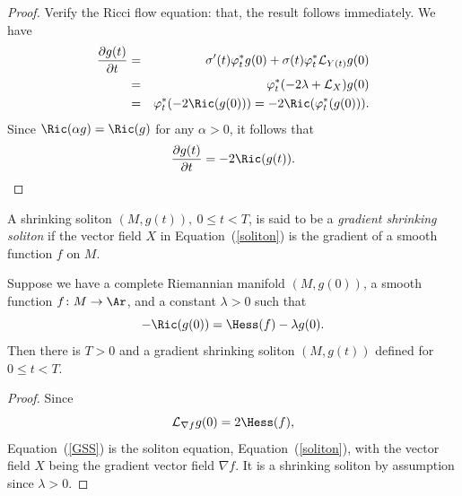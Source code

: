 \begin{proof}
\sketch Verify the Ricci flow equation:
that, the result follows immediately. We have
\begin{eqnarray*} \frac{\partial g(t)}{\partial t} & = &
\sigma'(t)\varphi_t^*g(0)+\sigma(t)\varphi_t^*{\mathcal L}_{Y(t)}g(0)\\
& = & \varphi_t^*(-2\lambda+{\mathcal L}_X)g(0)\\
& = & \varphi_t^*(-2\Ric(g(0))) =-2\Ric(\varphi_t^*(g(0))).
\end{eqnarray*}
Since $\Ric(\alpha g)=\Ric(g)$ for any $\alpha>0$, it follows that
$$\frac{\partial g(t)}{\partial t} = -2\Ric(g(t)).$$
\end{proof}



\begin{definition}\label{def:gradient-shrinking-soliton}
\leanok
A shrinking soliton $(M,g(t)),\ 0\le t<T$, is said to be a {\em
gradient shrinking soliton} if
the vector field $X$ in Equation~(\ref{soliton}) is the gradient of
a smooth function $f$ on $M$.
\end{definition}

\begin{proposition}\label{prop:gradient-shrinking-soliton-generation}
\label{GSSgeneration}

 Suppose we have a complete Riemannian manifold $(M,g(0))$, a
smooth function $f\colon M\to \Ar$, and a constant $\lambda>0$ such
that
\begin{equation}\label{GSS}
-\Ric(g(0))=\Hess(f)-\lambda g(0). \end{equation}
 Then there is $T>0$ and a gradient shrinking soliton
$(M,g(t))$ defined for  $0\le t<T.$ \end{proposition}

\begin{proof}
\sketch Since
$${\mathcal L}_{\nabla f}g(0)=2\Hess(f),$$
 Equation~(\ref{GSS}) is the soliton equation,
Equation~(\ref{soliton}), with the vector field $X$ being the
gradient vector field $\nabla f$. It is a shrinking soliton by
assumption since $\lambda>0$.
\end{proof}

